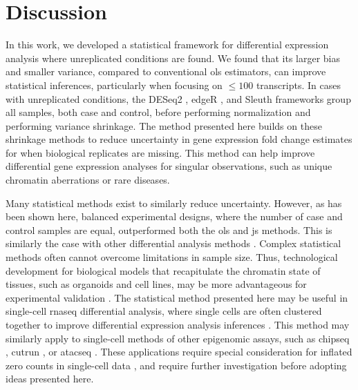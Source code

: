 \section{Discussion}

In this work, we developed a statistical framework for differential expression analysis where unreplicated conditions are found.
We found that its larger bias and smaller variance, compared to conventional \gls{ols} estimators, can improve statistical inferences, particularly when focusing on $\le 100$ transcripts.
In cases with unreplicated conditions, the DESeq2 \cite{loveModeratedEstimationFold2014}, edgeR \cite{robinsonEdgeRBioconductorPackage2010}, and Sleuth \cite{pimentelDifferentialAnalysisRNAseq2017,yiGenelevelDifferentialAnalysis2018} frameworks group all samples, both case and control, before performing normalization and performing variance shrinkage.
The method presented here builds on these shrinkage methods to reduce uncertainty in gene expression fold change estimates for when biological replicates are missing.
This method can help improve differential gene expression analyses for singular observations, such as unique chromatin aberrations or rare diseases.

Many statistical methods exist to similarly reduce uncertainty.
However, as has been shown here, balanced experimental designs, where the number of case and control samples are equal, outperformed both the \gls{ols} and \gls{js} methods.
This is similarly the case with other differential analysis methods \cite{schurchHowManyBiological2016,gierlinskiStatisticalModelsRNAseq2015}.
Complex statistical methods often cannot overcome limitations in sample size.
Thus, technological development for biological models that recapitulate the chromatin state of tissues, such as organoids and cell lines, may be more advantageous for experimental validation \cite{zanoniModelingNeoplasticDisease2020}.
The statistical method presented here may be useful in single-cell \gls{rnaseq} differential analysis, where single cells are often clustered together to improve differential expression analysis inferences \cite{chenAssessmentComputationalMethods2019}.
This method may similarly apply to single-cell methods of other epigenomic assays,  such as \gls{chipseq} \cite{rotemSinglecellChIPseqReveals2015}, \gls{cutrun} \cite{hainerProfilingPluripotencyFactors2019}, or \gls{atacseq} \cite{buenrostroSinglecellChromatinAccessibility2015}.
These applications require special consideration for inflated zero counts in single-cell data \cite{chenAssessmentComputationalMethods2019}, and require further investigation before adopting ideas presented here.
